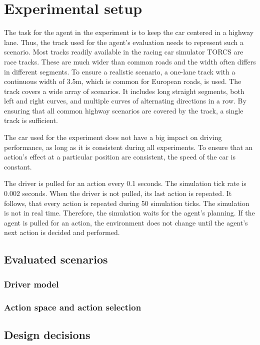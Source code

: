 \chapter{Experimental setup}
\label{sec:setup}

The task for the agent in the experiment is to keep the car centered in a highway lane. Thus, the track used for the agent's evaluation needs to represent such a scenario. Most tracks readily available in the racing car simulator TORCS are race tracks. These are much wider than common roads and the width often differs in different segments. To ensure a realistic scenario, a one-lane track with a continuous width of 3.5m, which is common for European roads, is used. The track covers a wide array of scenarios. It includes long straight segments, both left and right curves, and multiple curves of alternating directions in a row. By ensuring that all common highway scenarios are covered by the track, a single track is sufficient.

The car used for the experiment does not have a big impact on driving performance, as long as it is consistent during all experiments. To ensure that an action's effect at a particular position are consistent, the speed of the car is constant.

The driver is pulled for an action every 0.1 seconds. The simulation tick rate is 0.002 seconds. When the driver is not pulled, its last action is repeated. It follows, that every action is repeated during 50 simulation ticks. The simulation is not in real time. Therefore, the simulation waits for the agent's planning. If the agent is pulled for an action, the environment does not change until the agent's next action is decided and performed.

\section{Evaluated scenarios}
\subsection{Driver model}
\subsection{Action space and action selection}
\section{Design decisions}


